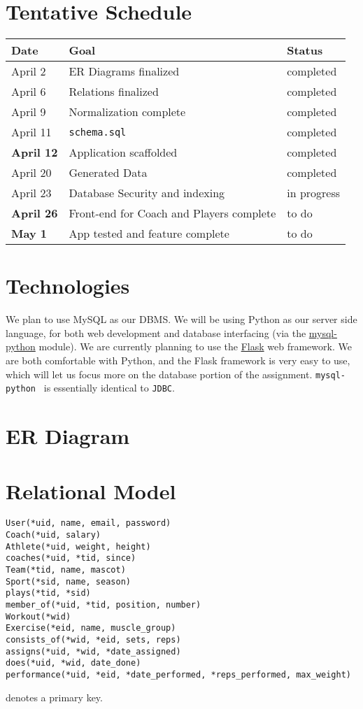 \documentclass{article}
\begin{document}
    \section*{Tentative Schedule}
    \begin{tabular}{l || l | l}
        Date & Goal & Status \\
        \hline
        April 2 & ER Diagrams finalized & completed \\ 
        April 6 & Relations finalized & completed \\ 
        April 9 & Normalization complete & completed \\ 
        April 11 & {\tt schema.sql} & completed \\ 
        \textbf{April 12} & Application scaffolded & completed \\ 
        April 20 & Generated Data & completed \\ 
        April 23 & Database Security and indexing & in progress \\ 
        \textbf{April 26} & Front-end for Coach and Players complete & to do \\ 
        \textbf{May 1} & App tested and feature complete & to do \\ 
    \end{tabular}

    \section*{Technologies}
    We plan to use MySQL as our DBMS. We will be using Python as our server side language,
    for both web development and database interfacing (via the 
    \href{http://mysql-python.sourceforge.net/MySQLdb.html}{mysql-python} module). 
    We are currently planning to use the \href{http://flask.pocoo.org/}{Flask} web framework.
    We are both comfortable with Python, and the Flask framework is very easy to use, which
    will let us focus more on the database portion of the assignment. {\tt mysql-python } is
    essentially identical to {\tt JDBC}.

    \section*{ER Diagram}
    

    \section*{Relational Model}
    \begin{verbatim}
User(*uid, name, email, password)
Coach(*uid, salary)
Athlete(*uid, weight, height)
coaches(*uid, *tid, since)
Team(*tid, name, mascot)
Sport(*sid, name, season)
plays(*tid, *sid)
member_of(*uid, *tid, position, number)
Workout(*wid)
Exercise(*eid, name, muscle_group)
consists_of(*wid, *eid, sets, reps)
assigns(*uid, *wid, *date_assigned)
does(*uid, *wid, date_done)
performance(*uid, *eid, *date_performed, *reps_performed, max_weight)
    \end{verbatim}
{\tt *} denotes a primary key.
\end{document}
